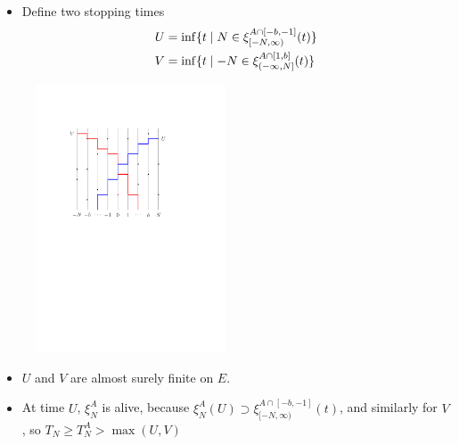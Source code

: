 \documentclass{beamer}
\newcommand{\ignore}[1]{}
\newcommand{\rb}{\ignore{[}]}
\begin{document}
\begin{frame}
  \begin{itemize}
    \item Define two stopping times
    \begin{align*}
      U &= \inf\set{t \st N \in \xi_{[-N,\infty)}^{A \cap [-b,-1]}(t)} \\
      V &= \inf\set{t \st -N \in \xi_{(-\infty,N\rb}^{A \cap [1,b]}(t)}
    \end{align*}
  \end{itemize}
  \pause
  \begin{figure}
    \centering
   \includegraphics[width=0.5\textwidth]{U_V.pdf}
 \end{figure}
\end{frame}

\begin{frame}
  \begin{itemize}
    \item $U$ and $V$ are almost surely finite on $E$.
    \item At time $U$, $\xi_{N}^{A}$ is alive, because $\xi_{N}^{A}(U) \supset \xi_{[-N,\infty)}^{A \cap [-b,-1]}(t)$, and similarly for $V$, so $T_{N} \geq T_{N}^{A} > \max(U,V)$
  \end{itemize}
\end{frame}
\end{document}
